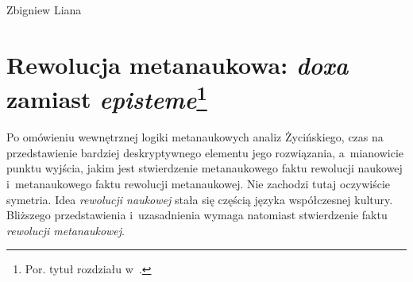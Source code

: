 \begin{artplenv}{Zbigniew Liana}
\section[Rewolucja metanaukowa: \textit{doxa} zamiast \textit{episteme}]{Rewolucja metanaukowa: \textit{doxa} zamiast \textit{episteme}\footnote{Por. tytuł rozdziału w~\parencite[s.~101]{zycinski_jezyk_1983}.
	}
}

Po omówieniu wewnętrznej logiki metanaukowych analiz Życińskiego, czas na przedstawienie bardziej deskryptywnego elementu
jego rozwiązania, a~mianowicie punktu wyjścia, jakim jest stwierdzenie metanaukowego faktu rewolucji naukowej i~metanaukowego
faktu rewolucji metanaukowej. Nie zachodzi tutaj oczywiście symetria. Idea \textit{rewolucji naukowej}
stała się częścią języka współczesnej kultury. Bliższego przedstawienia i~uzasadnienia wymaga natomiast stwierdzenie
faktu \textit{rewolucji metanaukowej}. 


\end{artplenv}
